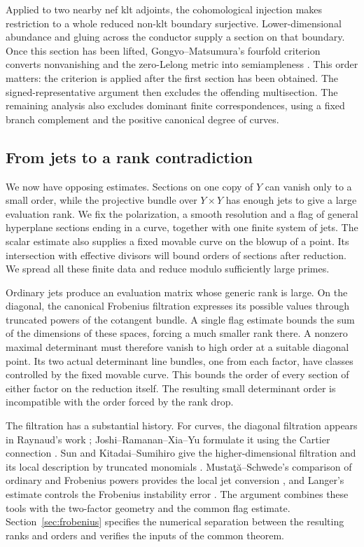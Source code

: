 Applied to two nearby nef klt adjoints, the cohomological injection
makes restriction to a whole reduced non-klt boundary surjective.
Lower-dimensional abundance and gluing across the conductor supply a
section on that boundary. Once this section has been lifted,
Gongyo--Matsumura's fourfold criterion converts nonvanishing and the
zero-Lelong metric into semiampleness
\cite[Corollary 5.3]{GongyoMatsumura2017}. This order matters: the
criterion is applied after the first section has been obtained.
The signed-representative argument then excludes the offending
multisection. The remaining analysis also excludes dominant finite
correspondences, using a fixed branch complement and the positive
canonical degree of curves.

\subsection*{From jets to a rank contradiction}

We now have opposing estimates. Sections on one copy of $Y$ can vanish
only to a small order, while the projective bundle over $Y\times Y$
has enough jets to give a large evaluation rank. We fix the polarization,
a smooth resolution and a flag of general hyperplane sections ending in
a curve, together with one finite system of jets. The scalar estimate
also supplies a fixed movable curve on the blowup of a point. Its
intersection with effective divisors will bound orders of sections
after reduction. We spread all these finite data and reduce modulo
sufficiently large primes.

Ordinary jets produce an evaluation matrix whose generic rank is large.
On the diagonal, the canonical Frobenius filtration expresses its
possible values through truncated powers of the cotangent bundle.
A single flag estimate bounds the sum of the dimensions of these spaces,
forcing a much smaller rank there. A nonzero maximal determinant must
therefore vanish to high order at a suitable diagonal point. Its two actual
determinant line bundles, one from each factor, have classes controlled
by the fixed movable curve. This bounds the order of every section of
either factor on the reduction itself. The resulting small determinant
order is incompatible with the order forced by the rank drop.

The filtration has a substantial history. For curves, the diagonal
filtration appears in Raynaud's work
\cite[Remarques~4.1.2(2)]{Raynaud1982}; Joshi--Ramanan--Xia--Yu
formulate it using the Cartier connection
\cite[Section 5.3]{JoshiRamananXiaYu2006}. Sun and Kitadai--Sumihiro
give the higher-dimensional filtration and its local description by
truncated monomials \cite[Theorem 3.7]{Sun2008}
\cite[Corollary 3.5]{KitadaiSumihiro2008}.
Musta\c{t}\u{a}--Schwede's comparison of ordinary and Frobenius powers
provides the local jet conversion \cite[proof of Proposition~2.12, Equation~(2.8)]{MustataSchwede2014},
and Langer's estimate controls the Frobenius instability error
\cite[Corollary 2.5]{Langer2004}. The argument combines these tools
with the two-factor geometry and the common flag estimate.
Section~\ref{sec:frobenius} specifies the numerical separation between
the resulting ranks and orders and verifies the inputs of the common theorem.

